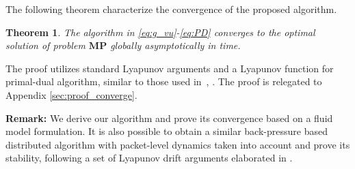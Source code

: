 \documentclass[10pt,conference]{IEEEtran}
\newtheorem{theorem}{\bf Theorem}
\begin{document}
The following theorem characterize the convergence of the proposed algorithm.
\begin{theorem}\label{thm:converge}
The algorithm in \eqref{eq:g_vu}-\eqref{eq:PD} converges to the optimal solution of problem $\mathbf{MP}$
globally asymptotically in time.
\end{theorem}
The proof utilizes standard Lyapunov arguments and a Lyapunov function for primal-dual algorithm, similar to those used
in~\cite{chen2008ump}, \cite{all:mathematics.cong.ctrl}. The proof is relegated to Appendix \ref{sec:proof_converge}.

\textbf{Remark:} We derive our algorithm and prove its convergence based on a fluid model formulation.
It is also possible to obtain a similar back-pressure based distributed algorithm with
packet-level dynamics taken into account and prove its stability,  following
a set of Lyapunov drift arguments elaborated in \cite{georgiadis2006resource}.



\begin{comment}
\begin{itemize}
\item In our algorithm, problem \eqref{eq:solve-g} is solved through the
back-pressure scheduling in a way that the neighbor with the maximum
aggregate back-pressure is selected and the transmission rate is set
as the node's upload capacity. Network coding guarantees the transmission
rate can be achieved.
\item Compared to the classical back-pressure algorithm \cite{georgiadis2006resource},
our algorithm is derived through the method of Lagrangian decomposition.
By considering packet-level dynamics, we can obtain similar distributed
solutions. Also our back-pressure scheduling involves the neighbor
selection process uniquely. The uniqueness is determined by the feature
of P2P networks where node's upload capacity is the bottleneck.
\item For each node $v\in V$, it chops its time into slots. In each time
slot, node $v$ selects one neighbor according to the neighbor scheduling
policy, and sends out one coded packet according to the content scheduling
policy at the rate of its upload capacity. Every node updates $\boldsymbol{\lambda}$
accordingly and the source updates the streaming rate $z$. We remark
that the algorithm
\end{itemize}

\end{comment}
\end{document}
